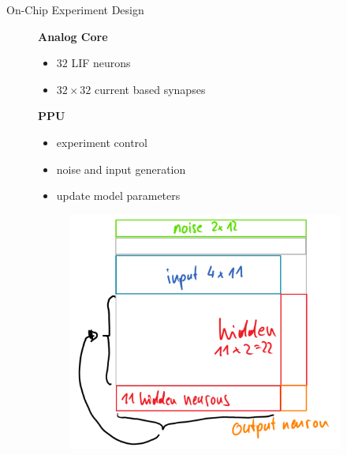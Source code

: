 \documentclass[12pt, aspectratio=169]{beamer}
\begin{document}
\begin{frame}{On-Chip Experiment Design}
    \begin{figure}[!htb]
    	    \textbf{Analog Core}
            \begin{itemize}
                \item $32$ LIF neurons
                \item $32 \times 32$ current based synapses
            \end{itemize}
        \textbf{PPU}
            \begin{itemize}
                \item experiment control
                \item noise and input generation
                \item update model parameters
            \end{itemize}
        
      	\endminipage\hfill
      	\centering
      	
            \scalebox{.9}{}
        
            \begin{figure}
                \includegraphics[scale=0.22]{mfp/synapse_array_transparent.png}
                \label{membrane_potential}
            \end{figure}
        \endminipage\hfill
    \end{figure}
\end{frame}
\end{document}
